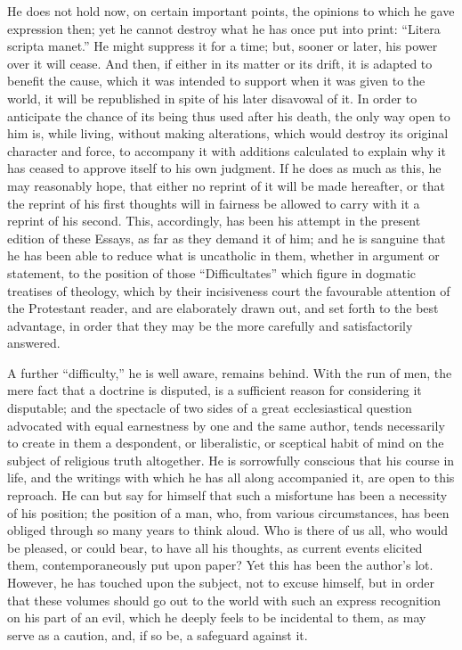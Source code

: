 He does not hold now, on certain important points, the opinions to
which he gave expression then; yet he cannot destroy what he has once
put into print: ``Litera scripta manet.'' He might suppress it
for a time; but, sooner or later, his power over it will cease. And
then, if either in its matter or its drift, it is adapted to benefit
the cause, which it was intended to support when it was given to the
world, it will be republished in spite of his later disavowal of it.
In order to anticipate the chance of its being thus used after his
death, the only way open to him is, while living, without making
alterations, which would destroy its original character and force, to
accompany it with additions calculated to explain why it has ceased to
approve itself to his own judgment. If he does as much as this, he
may reasonably hope, that either no reprint of it will be made
hereafter, or that the reprint of his first thoughts will in fairness
be allowed to carry with it a reprint of his second. This,
accordingly, has been his attempt in the present edition of these
Essays, as far as they demand it of him; and he is sanguine that he
has been able to reduce what is uncatholic in them, whether in
argument or statement, to the position of those ``Difficultates''
which figure in dogmatic treatises of theology, which by their
incisiveness court the favourable attention of the Protestant reader,
and are elaborately drawn out, and set forth to the best advantage, in
order that they may be the more carefully and satisfactorily answered.


A further ``difficulty,'' he is well aware, remains behind.
With the run of men, the mere fact that a doctrine is disputed, is a
sufficient reason for considering it disputable; and the spectacle of
two sides of a great ecclesiastical question advocated with equal
earnestness by one and the same author, tends necessarily to create in
them a despondent, or liberalistic, or sceptical habit of mind on the
subject of religious truth altogether. He is sorrowfully conscious
that his course in life, and the writings with which he has all along
accompanied it, are open to this reproach. He can but say for himself
that such a misfortune has been a necessity of his position; the
position of a man, who, from various circumstances, has been obliged
through so many years to think aloud. Who is there of us all, who
would be pleased, or could bear, to have all his thoughts, as
current events elicited them, contemporaneously put upon paper? Yet
this has been the author's lot. However, he has touched upon the
subject, not to excuse himself, but in order that these volumes should
go out to the world with such an express recognition on his part of an
evil, which he deeply feels to be incidental to them, as may serve as
a caution, and, if so be, a safeguard against it.


